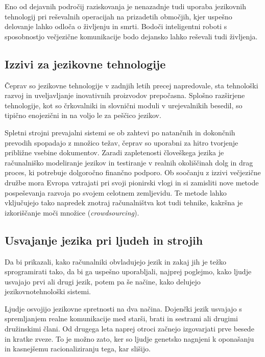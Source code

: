 \begin{multicols}{2}
Eno od dejavnih področij raziskovanja je nenazadnje tudi uporaba jezikovnih tehnologij pri reševalnih operacijah na prizadetih območjih, kjer uspešno delovanje lahko odloča o življenju in smrti. Bodoči inteligentni roboti s sposobnostjo večjezične komunikacije bodo dejansko lahko reševali tudi življenja.

\subsection{Izzivi za jezikovne tehnologije}

Čeprav so jezikovne tehnologije v zadnjih letih precej napredovale, sta tehnološki razvoj in uveljav\-ljanje inovativnih proizvodov prepočasna. Splošno razširjene tehnologije, kot so črkovalniki in slovnični moduli v urejevalnikih besedil, so tipično enojezični in na voljo le za peščico jezikov. 


Spletni stroj\-ni prevajalni sistemi se ob zahtevi po natančnih in dokončnih prevodih spopadajo z množico težav, čeprav so uporabni za hitro tvorjenje približne vsebine dokumentov. Zaradi zapletenosti človeškega jezika je računalniško mode\-liranje jezikov in testiranje v realnih okoliščinah dolg in drag proces, ki potrebuje dolgoročno finančno podporo. Ob soočanju z izzivi večjezične družbe mora Evropa vztrajati pri svoji pionirski vlogi in si zamisliti nove metode pospeševanja razvoja po svojem celotnem zemljevidu. Te metode lahko vključujejo tako napredek znotraj računalništva kot tudi tehnike, kakršna je izkoriščanje moči množice (\textit{crowdsourcing}).

\subsection{Usvajanje jezika pri ljudeh in strojih}

Da bi prikazali, kako računalniki obvladujejo jezik in zakaj jih je težko sprogramirati tako, da bi ga uspešno uporabljali, najprej poglejmo, kako ljudje usvajajo prvi ali drugi jezik, potem pa še načine, kako delujejo jezikovnotehnološki sistemi.


Ljudje osvojijo jezikovne spretnosti na dva načina. Dojenčki jezik usvajajo s spremljanjem realne komunikacije med starši, brati in sestrami ali drugimi družinskimi člani. Od drugega leta naprej otroci začnejo izgovarjati prve besede in kratke zveze. To je možno zato, ker so ljudje genetsko nagnjeni k oponašanju in kasnejšemu racionaliziranju tega, kar slišijo.


\end{multicols}
